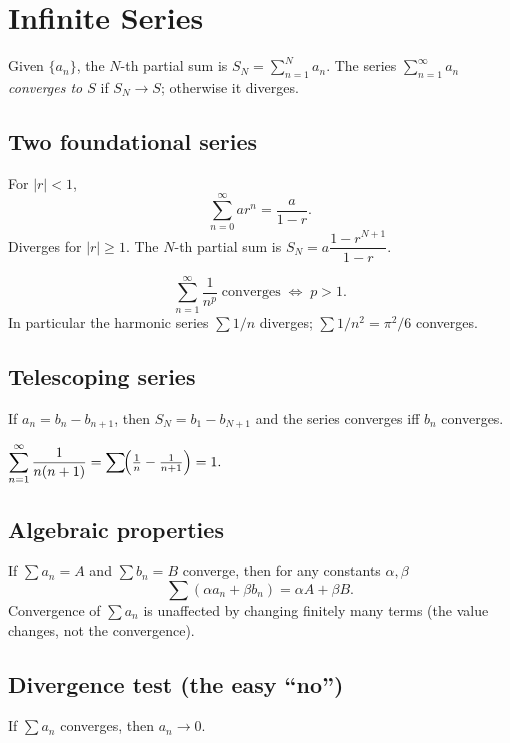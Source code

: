 \section{Infinite Series}

\begin{definition}
Given $\{a_n\}$, the $N$-th partial sum is $S_N = \sum_{n=1}^N a_n$. The series
$\sum_{n=1}^\infty a_n$ \emph{converges to $S$} if $S_N \to S$; otherwise it diverges.
\end{definition}

\subsection{Two foundational series}

\begin{keybox}
For $|r| < 1$,
\[ \sum_{n=0}^\infty a r^n = \frac{a}{1 - r}. \]
Diverges for $|r| \ge 1$. The $N$-th partial sum is
$S_N = a \dfrac{1 - r^{N+1}}{1 - r}$.
\end{keybox}

\begin{keybox}[$p$-series]
\[ \sum_{n=1}^\infty \frac{1}{n^p} \;\text{converges}\;\iff\; p > 1. \]
In particular the harmonic series $\sum 1/n$ diverges; $\sum 1/n^2 = \pi^2/6$ converges.
\end{keybox}

\subsection{Telescoping series}
If $a_n = b_n - b_{n+1}$, then $S_N = b_1 - b_{N+1}$ and the series converges iff $b_n$ converges.

\begin{example}
$\displaystyle \sum_{n=1}^\infty \frac{1}{n(n+1)} = \sum \!\Bigl(\tfrac{1}{n} - \tfrac{1}{n+1}\Bigr) = 1.$
\end{example}

\subsection{Algebraic properties}
If $\sum a_n = A$ and $\sum b_n = B$ converge, then for any constants $\alpha, \beta$
\[ \sum (\alpha a_n + \beta b_n) = \alpha A + \beta B. \]
Convergence of $\sum a_n$ is unaffected by changing finitely many terms (the value changes,
not the convergence).

\subsection{Divergence test (the easy ``no'')}
\begin{theorem}
If $\sum a_n$ converges, then $a_n \to 0$.
\end{theorem}

